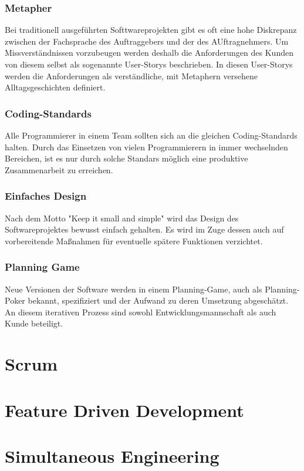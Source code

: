 \documentclass[a4paper, twopage]{scrreprt}
\begin{document}
\subsection{Metapher}
Bei traditionell ausgeführten Softtwareprojekten gibt es oft eine hohe Diskrepanz zwischen der Fachsprache des Auftraggebers und der des AUftragnehmers. Um Missverständnissen vorzubeugen werden deshalb die Anforderungen des Kunden von diesem selbst als sogenannte User-Storys beschrieben. In diesen User-Storys werden die Anforderungen als verständliche, mit Metaphern versehene Alltagsgeschichten definiert.
\subsection{Coding-Standards}
Alle Programmierer in einem Team sollten sich an die gleichen Coding-Standards halten. Durch das Einsetzen von vielen Programmierern in immer wechselnden Bereichen, ist es nur durch solche Standars möglich eine produktive Zusammenarbeit zu erreichen.
\subsection{Einfaches Design}
Nach dem Motto "Keep it small and simple" wird das Design des Softwareprojektes bewusst einfach gehalten. Es wird im Zuge dessen auch auf vorbereitende Maßnahmen für eventuelle spätere Funktionen verzichtet.
\subsection{Planning Game}
Neue Versionen der Software werden in einem Planning-Game, auch als Planning-Poker bekannt, spezifiziert und der Aufwand zu deren Umsetzung abgeschätzt. An diesem iterativen Prozess sind sowohl Entwicklungsmannschaft als auch Kunde beteiligt.\cite{wikipedia:xp}


\chapter{Scrum}
\label{ch:scrum}



\chapter{Feature Driven Development}



\chapter{Simultaneous Engineering}
\end{document}
